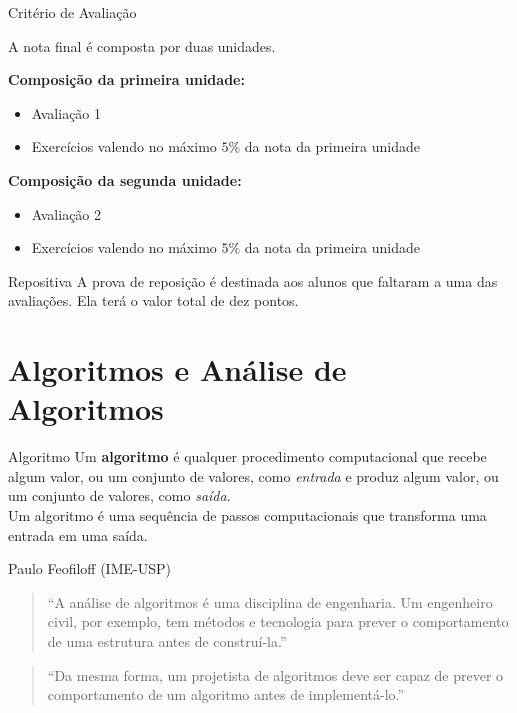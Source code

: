 \documentclass[aspectratio=169]{beamer}
\begin{document}
\begin{frame}{Critério de Avaliação}

  A nota final é composta por duas unidades.

  \textbf{Composição da primeira unidade:}
  \begin{itemize}
	  \item Avaliação 1
	  \item Exercícios valendo no máximo $5\%$ da nota da primeira unidade
  \end{itemize}
  \textbf{Composição da segunda unidade:}
  \begin{itemize}
	  \item Avaliação 2
	  \item Exercícios valendo no máximo $5\%$ da nota da primeira unidade
  \end{itemize}

	\begin{alertblock}{Repositiva}
		A prova de reposição é destinada \alert{aos alunos que faltaram} a uma das avaliações. Ela terá o valor total de dez pontos. 
	\end{alertblock}
  
\end{frame}



\section{Algoritmos e Análise de Algoritmos}

\begin{frame}{Algoritmo}
  Um \textbf{algoritmo} é qualquer procedimento computacional que recebe algum valor, ou um conjunto de valores, como \emph{entrada} e produz algum valor, ou um conjunto de valores, como \emph{saída}.\\[12pt]
  
  Um algoritmo é uma sequência de passos computacionais que transforma uma entrada em uma saída.
\end{frame}


\begin{frame}{Paulo Feofiloff (IME-USP)}
  \begin{quote}
	  ``A análise de algoritmos é uma disciplina de \alert{engenharia}. Um engenheiro civil, por exemplo, tem métodos e tecnologia para \alert{prever o comportamento} de uma estrutura antes de construí-la.''
  \end{quote}
  \vspace{6pt}
  \begin{quote}
    ``Da mesma forma, um projetista de algoritmos deve ser capaz de prever o comportamento de um algoritmo antes de implementá-lo.''
  \end{quote}
\end{frame}
\end{document}
